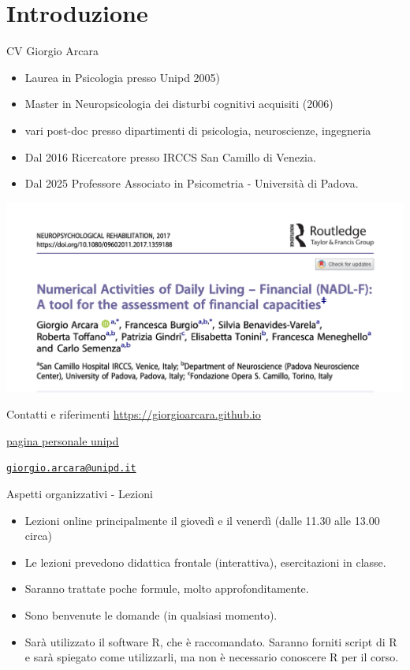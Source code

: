 \documentclass[
  ignorenonframetext,
]{beamer}
\providecommand{\tightlist}{%
  \setlength{\itemsep}{0pt}\setlength{\parskip}{0pt}}
\begin{document}
\section{Introduzione}\label{introduzione}

\begin{frame}{CV Giorgio Arcara}
\label{cv-giorgio-arcara}
\footnotesize

\begin{itemize}[<+->]
\item
  Laurea in Psicologia presso Unipd 2005)
\item
  Master in Neuropsicologia dei disturbi cognitivi acquisiti (2006)
\item
  vari post-doc presso dipartimenti di psicologia, neuroscienze,
  ingegneria
\item
  Dal 2016 Ricercatore presso IRCCS San Camillo di Venezia.
\item
  Dal 2025 Professore Associato in Psicometria - Università di Padova.
\end{itemize}

\pause

\hfill
\includegraphics[width=0.6\linewidth,height=\textheight,keepaspectratio]{Figures/NADL_F.png}
\end{frame}

\begin{frame}{Contatti e riferimenti}
\label{contatti-e-riferimenti}
\href{https://giorgioarcara.github.io}{\ul{https://giorgioarcara.github.io}}

\href{https://www.dpg.unipd.it/category/ruoli/personale-docente?key=4D0707A2DD6FCCD50B90E4C9F316A625}{\ul{pagina
personale unipd}}

\href{mailto:giorgio.arcara@unipd.it}{\nolinkurl{giorgio.arcara@unipd.it}}
\end{frame}

\begin{frame}{Aspetti organizzativi - Lezioni}
\label{aspetti-organizzativi---lezioni}
\begin{itemize}[<+->]
\tightlist
\item
  Lezioni online principalmente il giovedì e il venerdì (dalle 11.30
  alle 13.00 circa)
\item
  Le lezioni prevedono didattica frontale (interattiva), esercitazioni
  in classe.
\item
  Saranno trattate poche formule, molto approfonditamente.
\item
  Sono benvenute le domande (in qualsiasi momento).
\item
  Sarà utilizzato il software R, che è raccomandato. Saranno forniti
  script di R e sarà spiegato come utilizzarli, ma non è necessario
  conoscere R per il corso.
\end{itemize}
\end{frame}
\end{document}
